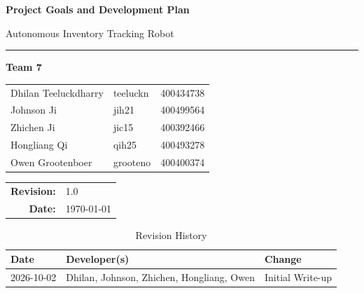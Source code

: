 \documentclass{article}
\begin{document}
	
\begin{titlepage}
	\centering
	
	{\fontsize{30}{34}\selectfont \bfseries Project Goals and Development Plan\par}
	
	\vspace{0.6cm}
	
	{\fontsize{20}{24}\selectfont Autonomous Inventory Tracking Robot\par}
	
	\vspace{1cm}
	
	\rule{0.75\textwidth}{0.5pt}
	
	\vspace{1.4cm}
	
	{\large \bfseries Team 7\par}
	
	\vspace{0.8cm}
	
	\begin{tabular}{lll}
		Dhilan Teeluckdharry & teeluckn & 400434738 \\
		Johnson Ji & jih21 & 400499564 \\
		Zhichen Ji & jic15 & 400392466 \\
		Hongliang Qi & qih25 & 400493278 \\
		Owen Grootenboer & grooteno & 400400374
	\end{tabular}
	
	\vfill
	
	\begin{tabular}{rl}
		\textbf{Revision:} & 1.0 \\
		\textbf{Date:} & \today
	\end{tabular}
	
	\vspace{1cm}
	
\end{titlepage}


\newpage{}


\begin{table}[hp]
\caption{Revision History} \label{TblRevisionHistory}
\begin{tabularx}{\textwidth}{llX}
\toprule
\textbf{Date} & \textbf{Developer(s)} & \textbf{Change}\\
\midrule
2026-10-02 & Dhilan, Johnson, Zhichen, Hongliang, Owen & Initial Write-up\\
\bottomrule
\end{tabularx}
\end{table}
\end{document}
